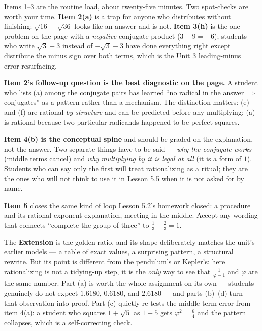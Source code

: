 \documentclass[10pt]{article}
\begin{document}
\begin{teachernote}
Items 1--3 are the routine load, about twenty-five minutes. Two spot-checks are worth your time.
\textbf{Item 2(a)} is a trap for anyone who distributes without finishing: $\sqrt{16}+\sqrt{36}$
looks like an answer and is not. \textbf{Item 3(h)} is the one problem on the page with a
\emph{negative} conjugate product ($3-9=-6$); students who write $\sqrt3+3$ instead of
$-\sqrt3-3$ have done everything right except distribute the minus sign over both terms, which is
the Unit 3 leading-minus error resurfacing.

\textbf{Item 2's follow-up question is the best diagnostic on the page.} A student who lists (a)
among the conjugate pairs has learned ``no radical in the answer $\Rightarrow$ conjugates'' as a
pattern rather than a mechanism. The distinction matters: (e) and (f) are rational \emph{by
structure} and can be predicted before any multiplying; (a) is rational because two particular
radicands happened to be perfect squares.

\textbf{Item 4(b) is the conceptual spine} and should be graded on the explanation, not the answer.
Two separate things have to be said --- \emph{why the conjugate works} (middle terms cancel) and
\emph{why multiplying by it is legal at all} (it is a form of $1$). Students who can say only the
first will treat rationalizing as a ritual; they are the ones who will not think to use it in
Lesson 5.5 when it is not asked for by name.

\textbf{Item 5} closes the same kind of loop Lesson 5.2's homework closed: a procedure and its
rational-exponent explanation, meeting in the middle. Accept any wording that connects
``complete the group of three'' to $\frac13+\frac23=1$.

The \textbf{Extension} is the golden ratio, and its shape deliberately matches the unit's earlier
models --- a table of exact values, a surprising pattern, a structural rewrite. But its point is
different from the pendulum's or Kepler's: here rationalizing is not a tidying-up step, it is the
\emph{only} way to see that $\frac{1}{\varphi-1}$ and $\varphi$ are the same number. Part (a) is
worth the whole assignment on its own --- students genuinely do not expect $1.6180$, $0.6180$, and
$2.6180$ --- and parts (b)--(d) turn that observation into proof. Part (c) quietly re-tests the
middle-term error from item 4(a): a student who squares $1+\sqrt5$ as $1+5$ gets
$\varphi^{2}=\frac{6}{4}$ and the pattern collapses, which is a self-correcting check.
\end{teachernote}
\end{document}
